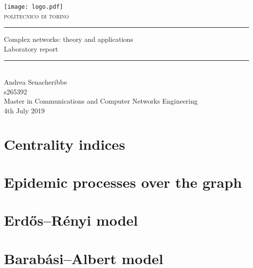 \documentclass [11pt]{article}
\begin{document}
\begin{titlepage}
		\centering
		\texttt{[image: logo.pdf]}\\[0.5 cm]
		\textsc{\LARGE politecnico di torino}\\[4 cm]

				
		\rule{\linewidth}{0.2 mm} 
		{ \huge Complex networks: theory and applications\\Laboratory report}
		\rule{\linewidth}{0.2 mm} \\[4.5 cm]

			\LARGE Andrea Senacheribbe\\s265392\\[4cm]
		\Large Master in Communications and Computer Networks Engineering\\[0.7cm]

		
		\Large 4th July 2019	
		
\end{titlepage}

\section{Centrality indices}

\pagebreak

\section{Epidemic processes over the graph}

\pagebreak

\section{Erdős–Rényi model}

\pagebreak

\section{Barabási–Albert model}


\newpage
\printbibliography
\end{document}
